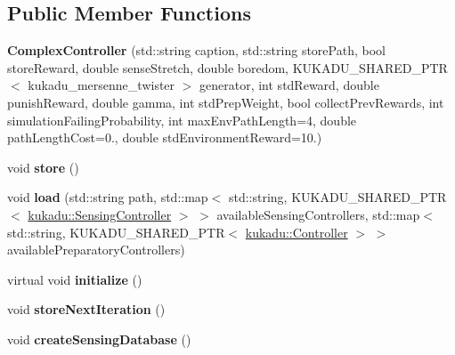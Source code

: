 \subsection*{Public Member Functions}
\begin{DoxyCompactItemize}
\item 
\hypertarget{classkukadu_1_1ComplexController_aaf2e3c2cd9221fb38090d9bf3b26ac43}{{\bfseries Complex\-Controller} (std\-::string caption, std\-::string store\-Path, bool store\-Reward, double sense\-Stretch, double boredom, K\-U\-K\-A\-D\-U\-\_\-\-S\-H\-A\-R\-E\-D\-\_\-\-P\-T\-R$<$ kukadu\-\_\-mersenne\-\_\-twister $>$ generator, int std\-Reward, double punish\-Reward, double gamma, int std\-Prep\-Weight, bool collect\-Prev\-Rewards, int simulation\-Failing\-Probability, int max\-Env\-Path\-Length=4, double path\-Length\-Cost=0., double std\-Environment\-Reward=10.)}\label{classkukadu_1_1ComplexController_aaf2e3c2cd9221fb38090d9bf3b26ac43}

\item 
\hypertarget{classkukadu_1_1ComplexController_ad79530c882119d956bb0d34669a2f4da}{void {\bfseries store} ()}\label{classkukadu_1_1ComplexController_ad79530c882119d956bb0d34669a2f4da}

\item 
\hypertarget{classkukadu_1_1ComplexController_ab2fc3490e103e0a884b767e9c34cea31}{void {\bfseries load} (std\-::string path, std\-::map$<$ std\-::string, K\-U\-K\-A\-D\-U\-\_\-\-S\-H\-A\-R\-E\-D\-\_\-\-P\-T\-R$<$ \hyperlink{classkukadu_1_1SensingController}{kukadu\-::\-Sensing\-Controller} $>$ $>$ available\-Sensing\-Controllers, std\-::map$<$ std\-::string, K\-U\-K\-A\-D\-U\-\_\-\-S\-H\-A\-R\-E\-D\-\_\-\-P\-T\-R$<$ \hyperlink{classkukadu_1_1Controller}{kukadu\-::\-Controller} $>$ $>$ available\-Preparatory\-Controllers)}\label{classkukadu_1_1ComplexController_ab2fc3490e103e0a884b767e9c34cea31}

\item 
\hypertarget{classkukadu_1_1ComplexController_a22593ed34bf58ee205ddab925bc0d03f}{virtual void {\bfseries initialize} ()}\label{classkukadu_1_1ComplexController_a22593ed34bf58ee205ddab925bc0d03f}

\item 
\hypertarget{classkukadu_1_1ComplexController_a13563bd973c9270984971638484df98d}{void {\bfseries store\-Next\-Iteration} ()}\label{classkukadu_1_1ComplexController_a13563bd973c9270984971638484df98d}

\item 
\hypertarget{classkukadu_1_1ComplexController_a3ebd8d88dc147461fbec6075478b4f7e}{void {\bfseries create\-Sensing\-Database} ()}\label{classkukadu_1_1ComplexController_a3ebd8d88dc147461fbec6075478b4f7e}


\end{DoxyCompactItemize}
